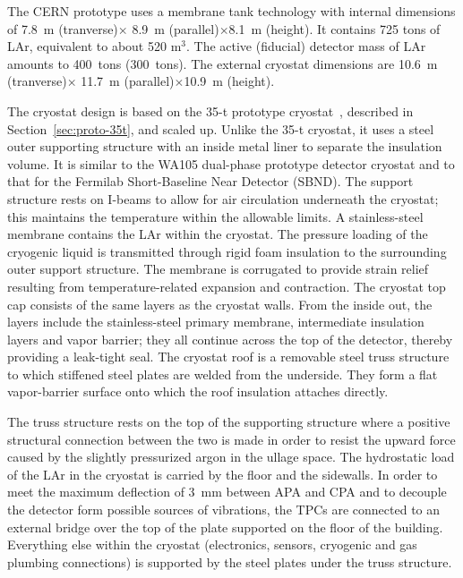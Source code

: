 The %
CERN prototype uses a membrane tank technology with internal dimensions of
7.8~m (tranverse)$\times$ 8.9~m (parallel)$\times$8.1~m (height).
It contains  725 tons of LAr, equivalent to about 520 m$^3$. The active (fiducial) detector mass of LAr amounts to 400~tons (300~tons). 
The external cryostat dimensions are 10.6~m (tranverse)$\times$ 11.7~m (parallel)$\times$10.9~m (height).

The cryostat design is based on %
the 35-t prototype cryostat~\cite{montanari_35ton}, described in Section~\ref{sec:proto-35t}, and scaled up.
Unlike the 35-t cryostat, it uses a steel outer supporting structure with an inside metal liner to 
 separate the insulation volume. It is similar to the WA105 dual-phase prototype detector cryostat and to that for the Fermilab Short-Baseline Near Detector (SBND). The support structure rests on I-beams to allow for air circulation underneath the cryostat; this maintains the temperature within the allowable limits.
A stainless-steel membrane contains the LAr within the cryostat. The pressure loading of the cryogenic liquid is transmitted through rigid foam insulation to the surrounding outer support structure. The membrane is corrugated to provide strain relief resulting from temperature-related expansion and contraction. The cryostat top cap consists of the same layers as the cryostat walls. %
%
From the inside out, the layers include 
the stainless-steel primary membrane, intermediate insulation layers and vapor barrier; they all continue across
the top of the detector, thereby providing a leak-tight seal.
The cryostat roof is a removable steel truss structure
to which stiffened steel plates are welded from the
underside. They form a flat vapor-barrier surface onto which the roof insulation attaches directly.


The truss structure rests on the top of the supporting structure where a positive structural connection
between the two is made in order to resist the upward force caused by the slightly pressurized argon in the ullage
space. The hydrostatic load of the LAr in the cryostat is carried by the floor and the sidewalls. In order to meet the maximum deflection of 3~mm between APA and CPA and to decouple the detector form possible sources of vibrations, the TPCs are connected to an external bridge over the top of the plate supported on the floor of the building. Everything else within the cryostat
(electronics, sensors, cryogenic and gas plumbing connections) is
supported by the steel plates under the truss structure.

